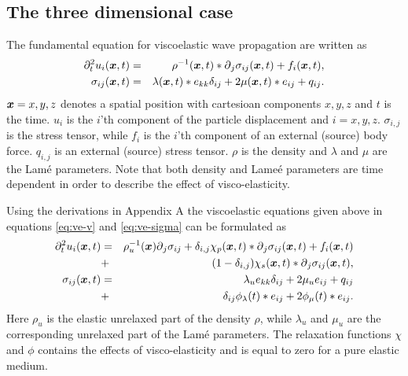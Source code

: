 \documentclass[11pt]{article}
\begin{document}
\subsection{The three dimensional case}
The fundamental equation for viscoelastic wave propagation are written as
\begin{eqnarray}
  \partial^2_t{u_i(\mbox{\boldmath $x$}, t)} & = & \rho^{-1}(\mbox{\boldmath $x$},t)*\mbox{$\partial$}_j \sigma_{ij}(\mbox{\boldmath $x$}, t) 
                                               +f_i(\mbox{\boldmath $x$},t),     
					   \label{eq:ve-v}      \\
  \sigma_{ij}(\mbox{\boldmath $x$}, t) & = & 
                    \lambda(\mbox{\boldmath $x$},t)* e_{kk}\delta_{ij} + 2\mu(\mbox{\boldmath $x$},t)* e_{ij} 
                                               +q_{ij}.          
					  \label{eq:ve-sigma}
\end{eqnarray}
$\mbox{\boldmath $x$}=x,y,z$ denotes a spatial position with cartesioan components 
$x,y,z$ and $t$ is
the time.
$u_i$ is the $i$'th component of the particle
displacement and $i=x,y,z$. $\sigma_{i,j}$ is the stress tensor, while
$f_i$ is the $i$'th component of an external (source) body force. 
$q_{i,j}$ is an external (source) stress tensor.
$\rho$ is the density and $\lambda$ and $\mu$ are the Lam\'{e} parameters.
Note that both density and Lame\'{e} parameters are time dependent in order
to describe the effect of visco-elasticity.

Using the derivations in Appendix A the viscoelastic equations given
above in equations \eqref{eq:ve-v} and \eqref{eq:ve-sigma}
can be formulated as
\begin{eqnarray}
  \partial^2_t{u_i(\mbox{\boldmath $x$}, t)} 
              & = & \rho^{-1}_u(\mbox{\boldmath $x$})\mbox{$\partial$}_j\sigma_{ij}+
                    \delta_{i,j}\chi_{p}(\mbox{\boldmath $x$},t)*\mbox{$\partial$}_j 
                    \sigma_{ij}(\mbox{\boldmath $x$}, t) + f_i(\mbox{\boldmath $x$},t)           \nonumber\\ 
              & + & (1-\delta_{i,j})\chi_{s}(\mbox{\boldmath $x$},t)*\mbox{$\partial$}_j      
                    \sigma_{ij}(\mbox{\boldmath $x$},t),                         \\
					   \label{eq:v}
  \sigma_{ij}(\mbox{\boldmath $x$}, t) & = & 
                    \lambda_u e_{kk}\delta_{ij} + 2\mu_u e_{ij} 
                                               +q_{ij}          \nonumber\\
                      & + & \delta_{ij}\phi_{\lambda}(t)*e_{ij} 
                                         +2\phi_{\mu}(t)*e_{ij}.
					  \label{eq:sigma}
\end{eqnarray}
Here $\rho_u$ is the elastic unrelaxed part of the density $\rho$, 
while $\lambda_u$ and $\mu_u$ are the corresponding unrelaxed part
of the Lam\'{e} parameters. The relaxation functions $\chi$ and $\phi$ contains
the effects of visco-elasticity and is equal to zero for a pure elastic medium.
\end{document}
